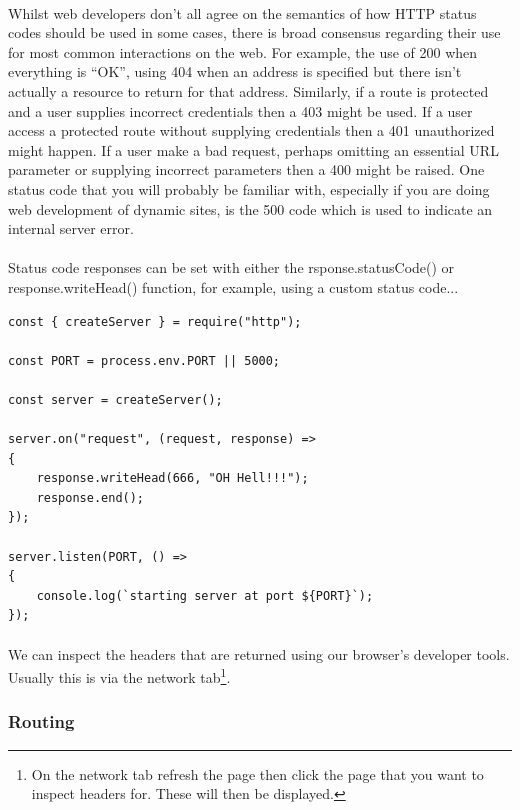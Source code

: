 \documentclass[10pt, a4paper, twosize]{article}
\begin{document}
\paragraph{} Whilst web developers don't all agree on the semantics of how HTTP status codes should be used in some cases, there is broad consensus regarding their use for most common interactions on the web. For example, the use of 200 when everything is ``OK'', using 404 when an address is specified but there isn't actually a resource to return for that address. Similarly, if a route is protected and a user supplies incorrect credentials then a 403 might be used. If a user access a protected route without supplying credentials then a 401 unauthorized might happen. If a user make a bad request, perhaps omitting an essential URL parameter or supplying incorrect parameters then a 400 might be raised. One status code that you will probably be familiar with, especially if you are doing web development of dynamic sites, is the 500 code which is used to indicate an internal server error.

\paragraph{} Status code responses can be set with either the rsponse.statusCode() or response.writeHead() function, for example, using a custom status code...

\begin{lstlisting}
const { createServer } = require("http");

const PORT = process.env.PORT || 5000;

const server = createServer();

server.on("request", (request, response) => 
{
    response.writeHead(666, "OH Hell!!!");
    response.end();
});

server.listen(PORT, () => 
{
    console.log(`starting server at port ${PORT}`);
});
\end{lstlisting}

\paragraph{} We can inspect the headers that are returned using our browser's developer tools. Usually this is via the network tab\footnote{On the network tab refresh the page then click the page that you want to inspect headers for. These will then be displayed.}.



\subsubsection{Routing}
\end{document}
